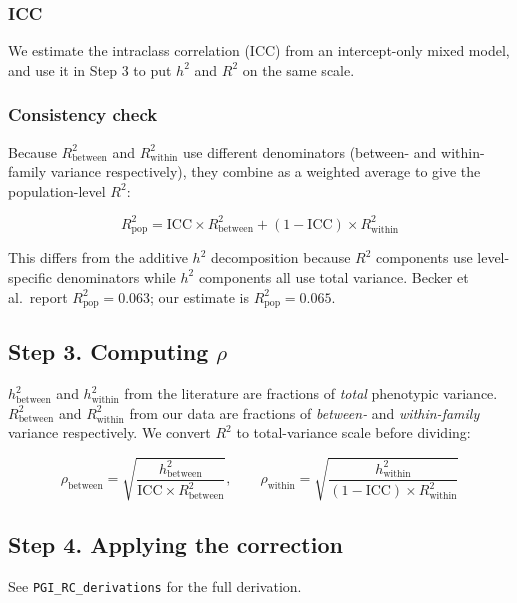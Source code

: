 \documentclass[
]{article}
\begin{document}
\subsubsection{ICC}

We estimate the intraclass correlation (ICC) from an intercept-only
mixed model, and use it in Step 3 to put \(h^2\) and \(R^2\) on the same
scale.

\subsubsection{Consistency check}

Because \(R^2_\text{between}\) and \(R^2_\text{within}\) use different
denominators (between- and within-family variance respectively), they
combine as a weighted average to give the population-level \(R^2\):

\[R^2_\text{pop} = \text{ICC} \times R^2_\text{between} + (1 - \text{ICC}) \times R^2_\text{within}\]

This differs from the additive \(h^2\) decomposition because \(R^2\)
components use level-specific denominators while \(h^2\) components all
use total variance. Becker et al.~report \(R^2_\text{pop} = 0.063\); our
estimate is \(R^2_\text{pop} = 0.065\).


\subsection{\texorpdfstring{Step 3. Computing
\(\rho\)}{Step 3. Computing \textbackslash rho}}\label{step-3.-computing-rho}

\(h^2_\text{between}\) and \(h^2_\text{within}\) from the literature are
fractions of \emph{total} phenotypic variance. \(R^2_\text{between}\)
and \(R^2_\text{within}\) from our data are fractions of \emph{between-}
and \emph{within-family} variance respectively. We convert \(R^2\) to
total-variance scale before dividing:

\[\rho_\text{between} = \sqrt{\frac{h^2_\text{between}}{\text{ICC} \times R^2_\text{between}}}, \qquad \rho_\text{within} = \sqrt{\frac{h^2_\text{within}}{(1 - \text{ICC}) \times R^2_\text{within}}}\]


\subsection{Step 4. Applying the
correction}

See \texttt{PGI\_RC\_derivations} for the full derivation.
\end{document}

